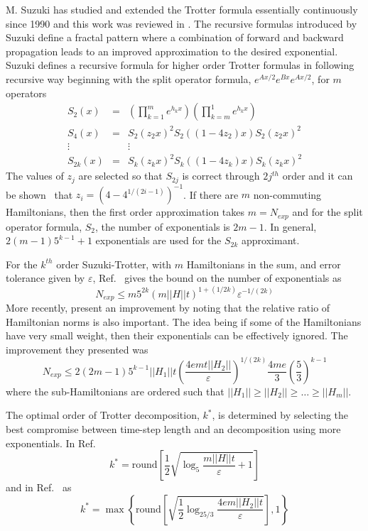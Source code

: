 \documentclass[11pt,oneside,final]{huthesis}%
\begin{document}
M. Suzuki has studied and extended the Trotter formula essentially continuously since 1990 and this work was reviewed in \cite{Hatano05}. The recursive formulas introduced by Suzuki define a fractal pattern where a combination of forward and backward propagation leads to an improved approximation to the desired exponential. Suzuki defines a recursive formula for higher order Trotter formulas in following recursive way beginning with the split operator formula, $e^{Ax/2}e^{Bx}e^{Ax/2}$, for $m$ operators
\begin{eqnarray}
	S_2(x)&=& \left(\prod_{k=1}^m e^{{h}_kx}\right)\left(\prod_{k=m}^1 e^{{h}_kx}\right)\\
	S_4(x)&=& S_2(z_2x)^2S_2( (1-4z_2)x)S_2(z_2x)^2\\
	\vdots& &\vdots\nonumber\\
	S_{2k}(x)&=& S_k(z_kx)^2S_k( (1-4z_k)x)S_k(z_kx)^2
\end{eqnarray}
The values of $z_j$ are selected so that $S_{2j}$ is correct through $2j^{th}$ order and it can be shown~\cite{Hatano05} that $z_i=(4-4^{1/(2i-1)})^{-1}$.  If there are $m$ non-commuting Hamiltonians, then the first order approximation takes  $m=N_{exp}$ and for the split operator formula, $S_2$, the number of exponentials is $2m-1$.  In general, $2(m-1)5^{k-1}+1$ exponentials are used for the $S_{2k}$ approximant. 


 For the $k^{th}$ order Suzuki-Trotter, with $m$ Hamiltonians in the sum, and error tolerance given by $\varepsilon$, Ref.~\cite{Berry07} gives the bound on the number of exponentials as 
 \begin{equation}N_{exp}\leq m5^{2k}(m||H||t)^{1+(1/2k)}\varepsilon^{-1/(2k)}\end{equation}
	 More recently, \cite{Papageorgiou10} present an improvement by noting that the relative ratio of Hamiltonian norms is also important. The idea being if some of the Hamiltonians have very small weight, then their exponentials can be effectively ignored.  The improvement they presented was 
\begin{equation}N_{exp}\leq 2(2m-1)5^{k-1}||H_1||t\left( \frac{ 4emt||H_2||}{\varepsilon} \right)^{1/(2k)}\frac{4me}{3}\left(\frac{5}{3} \right)^{k-1}\end{equation} 
where the sub-Hamiltonians are ordered such that $||H_1||\geq||H_2||\geq\ldots\geq||H_m||$. 

The optimal order of Trotter decomposition, $k^*$, is determined by selecting the best compromise between time-step length and an decomposition using more exponentials.  In Ref.~\cite{Berry07}
\begin{equation}
	k^*=\textrm{round}\left[\frac{1}{2} \sqrt{\log_5\frac{m||H||t}{\varepsilon} +1}\right]
\end{equation}
and in Ref.~\cite{Papageorgiou10} as
\begin{equation}
	k^*=\max\left\{\textrm{round}\left[ \sqrt{\frac{1}{2}\log_{25/3}\frac{4em||H_2||t}{\varepsilon} }\right],1\right\}
\end{equation}
\end{document}
